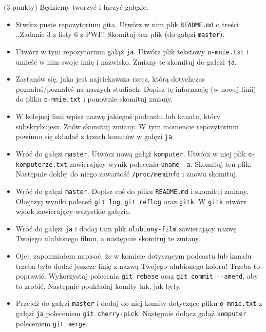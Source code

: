 \begin{zadanie} (3 punkty) Będziemy tworzyć i łączyć gałęzie.
\begin{itemize} 
\item 
Stwórz puste repozytorium gita.
Utwórz w nim plik \verb+README.md+ o treści ,,Zadanie 3 z listy 6 z PWI''. Skomituj ten plik (do gałęzi \verb+master+).

\item Utwórz w tym repozytorium gałąź \verb+ja+. Utwórz plik tekstowy \verb+o-mnie.txt+ i umieść w nim swoje imię i nazwisko. Zmiany te skomituj do gałęzi \verb+ja+.

\item Zastanów się, jaka jest najciekawsza rzecz, którą dotychczas poznałaś/poznałeś na naszych studiach. Dopisz tę informację (w nowej linii) do pliku \verb+o-mnie.txt+ i ponownie skomituj zmiany.

\item W kolejnej linii wpisz nazwę jakiegoś podcastu lub kanału, który subskrybujesz. Znów skomituj zmiany. W tym momencie repozytorium powinno się składać z trzech komitów w gałęzi \verb+ja+. 

\item  Wróć do gałęzi \verb+master+. Utwórz nową gałąź \verb+komputer+. Utwórz w niej plik \verb+o-komputerze.txt+ zawierający wynik polecenia \verb+uname -a+. Skomituj ten plik. Następnie doklej do niego zawartość \verb+/proc/meminfo+ i znowu skomituj.

\item Wróć do gałęzi \verb+master+. Dopisz coś do pliku \verb+README.md+ i skomituj zmiany. Obejrzyj wyniki poleceń  \verb+git log+, \verb+git reflog+ oraz \verb+gitk+. W \verb+gitk+ utwórz widok zawierający wszystkie gałęzie.

\item Wróć do gałęzi \verb+ja+ i dodaj tam plik \verb+ulubiony-film+ zawierający nazwę Twojego ulubionego filmu, a następnie skomituj te zmiany.

\item Ojej, zapomniałem napisać, że w komicie dotyczącym podcastu lub kanału trzeba było dodać jeszcze linię z nazwą Twojego ulubionego koloru! Trzeba to poprawić. Wykorzystaj polecenia \verb+git rebase+ oraz \verb+git commit --amend+, aby to zrobić. Następnie poukładaj komity tak, jak były.

\item Przejdź do gałęzi \verb+master+ i dodaj do niej komity dotyczące pliku \verb+o-mnie.txt+ z gałęzi \verb+ja+ poleceniem \verb+git cherry-pick+. Następnie dołącz gałąź \verb+komputer+ poleceniem \verb+git merge+.


\end{itemize}
\end{zadanie}
